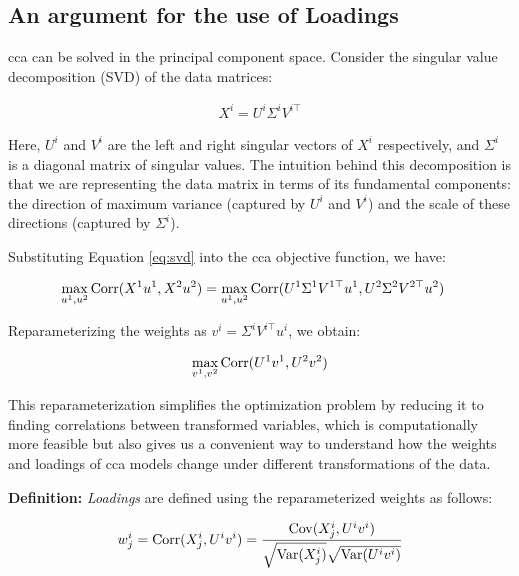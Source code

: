 \subsection{An argument for the use of Loadings}\label{subsec:an-argument-for-the-use-of-loadings}

\acrshort{cca} can be solved in the principal component space. Consider the singular value decomposition (SVD) of the data matrices:

\begin{align}
    X^{i} = U^{i}\Sigma^{i}V^{i\top} \label{eq:svd}
\end{align}

Here, $U^{i}$ and $V^{i}$ are the left and right singular vectors of $X^{i}$ respectively, and $\Sigma^{i}$ is a diagonal matrix of singular values. 
The intuition behind this decomposition is that we are representing the data matrix in terms of its fundamental components: the direction of maximum variance (captured by $U^{i}$ and $V^{i}$) and the scale of these directions (captured by $\Sigma^{i}$).

Substituting Equation \ref{eq:svd} into the \acrshort{cca} objective function, we have:

\begin{align}
    \max_{u^{1}, u^{2}} \operatorname{Corr}(X^{1}u^{1}, X^{2}u^{2}) &= \max_{u^{1}, u^{2}} \operatorname{Corr}(U^{1}\Sigma^{1}V^{1\top}u^{1}, U^{2}\Sigma^{2}V^{2\top}u^{2}) \label{eq:cca_obj}
\end{align}

Reparameterizing the weights as $v^{i} = \Sigma^{i}V^{i\top}u^{i}$, we obtain:

\begin{align}
    \max_{v^{1}, v^{2}} \operatorname{Corr}(U^{1}v^{1}, U^{2}v^{2}) \label{eq:reparam}
\end{align}

This reparameterization simplifies the optimization problem by reducing it to finding correlations between transformed variables, which is computationally more feasible but also gives us a convenient way to understand how the weights and \gls{loadings} of \acrshort{cca} models change under different transformations of the data.

\textbf{Definition:} \textit{Loadings} are defined using the reparameterized weights as follows:

\begin{align}
    w^{i}_j = \operatorname{Corr}(X^{i}_j, U^{i}v^{i}) = \frac{\mathrm{Cov}(X^{i}_j, U^{i}v^{i})}{\sqrt{\mathrm{Var}(X^{i}_j)}\sqrt{\mathrm{Var}(U^{i}v^{i})}} \label{eq:loading_def}
\end{align}

